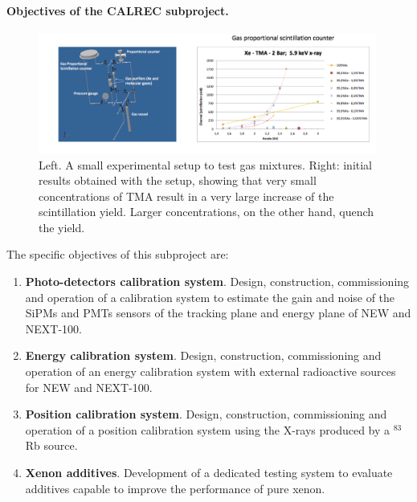 \paragraph{Objectives of the CALREC subproject.}

\begin{figure}
\begin{center}
\includegraphics[width=0.99\textwidth]{img/TMA.png}
\caption{\small Left. A small experimental setup to test gas mixtures. Right: initial results obtained with the setup, showing that very small concentrations of TMA result in a very large increase of the scintillation yield. Larger concentrations, on the other hand, quench the yield. }
\label{fig:additives}
\end{center}
\end{figure}

The specific objectives of this subproject are:
\begin{enumerate}
\item {\bf Photo-detectors calibration system}. Design, construction, commissioning and operation of a calibration system to estimate the gain and noise of the SiPMs and PMTs sensors of the tracking plane and energy plane of NEW and NEXT-100. 

\item {\bf Energy calibration system}. Design, construction, commissioning and operation of an energy calibration system with external radioactive sources for NEW and NEXT-100.

\item {\bf Position calibration system}. Design, construction, commissioning and operation of a position calibration system using the X-rays produced by a $^{83}$Rb source. 

\item {\bf Xenon additives}. Development of a dedicated testing system to evaluate additives capable to improve the performance of pure xenon. 

\end{enumerate}

